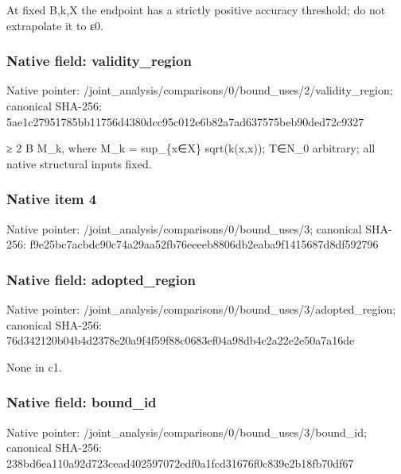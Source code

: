 \documentclass[10pt,a4paper]{article}
\begin{document}
\begingroup\raggedright\sloppy At fixed B,\allowbreak{}k,\allowbreak{}X the endpoint has a strictly positive accuracy threshold;\allowbreak{} do not extrapolate it to {\AtlasUnicodeText ε}\allowbreak{}0.\par\endgroup

\subsubsection{Native field: validity\_\allowbreak{}region}
Native pointer: /joint\_\allowbreak{}analysis/comparisons/0/bound\_\allowbreak{}uses/2/validity\_\allowbreak{}region; canonical SHA-256: 5ae1c27951785bb11756d4380dcc95c012e6b82a7ad637575beb90ded72c9327

\begingroup\raggedright{}\allowbreak{} {\AtlasUnicodeSymbols ≥}\allowbreak{} 2 B M\_\allowbreak{}k,\allowbreak{} where M\_\allowbreak{}k =\allowbreak{} sup\_\allowbreak{}\{x{\AtlasUnicodeSymbols ∈}\allowbreak{}X\} sqrt(k(x,\allowbreak{}x));\allowbreak{} T{\AtlasUnicodeSymbols ∈}\allowbreak{}N\_\allowbreak{}0 arbitrary;\allowbreak{} all native structural inputs fixed.\par\endgroup

\subsubsection{Native item 4}
Native pointer: /joint\_\allowbreak{}analysis/comparisons/0/bound\_\allowbreak{}uses/3; canonical SHA-256: f9e25bc7acbdc90c74a29aa52fb76eeeeb8806db2eaba9f1415687d8df592796

\subsubsection{Native field: adopted\_\allowbreak{}region}
Native pointer: /joint\_\allowbreak{}analysis/comparisons/0/bound\_\allowbreak{}uses/3/adopted\_\allowbreak{}region; canonical SHA-256: 76d342120b04b4d2378e20a9f4f59f88c0683ef04a98db4c2a22e2e50a7a16de

\begingroup\raggedright\sloppy None in c1.\par\endgroup

\subsubsection{Native field: bound\_\allowbreak{}id}
Native pointer: /joint\_\allowbreak{}analysis/comparisons/0/bound\_\allowbreak{}uses/3/bound\_\allowbreak{}id; canonical SHA-256: 238bd6ea110a92d723cead402597072edf0a1fcd31676f0c839e2b18fb70df67
\end{document}
